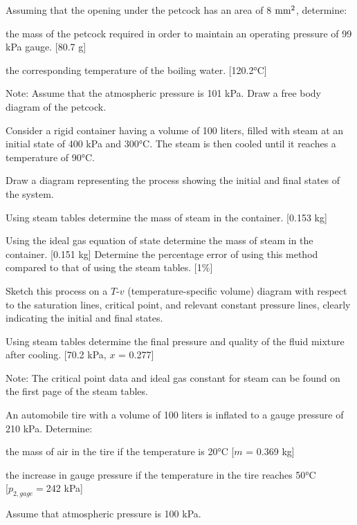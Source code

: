 \begin{homework}
Assuming that the opening under the petcock has an area of 8 $\rm mm^2$, determine:

\begin{questionparts}
\item the mass of the petcock required in order to maintain an operating pressure of 99 kPa gauge. {\color{red}[80.7 g]}

\item the corresponding temperature of the boiling water. {\color{red}[120.2°C]}
\end{questionparts}
Note: Assume that the atmospheric pressure is 101 kPa. Draw a free body diagram of the petcock.

\question Consider a rigid container having a volume of 100 liters, filled with steam at an initial state of 400 kPa and 300°C. The steam is then cooled until it reaches a temperature of 90°C.

\begin{questionparts}
\item Draw a diagram representing the process showing the initial and final states of the system.

\item Using steam tables determine the mass of steam in the container. {\color{red} [0.153 kg]}

\item Using the ideal gas equation of state determine the mass of steam in the container. {\color{red} [0.151 kg]}
Determine the percentage error of using this method compared to that of using the steam tables. {\color{red}[1\%]}

\item Sketch this process on a $T$-$v$ (temperature-specific volume) diagram with respect to the saturation lines, critical point, and relevant constant pressure lines, clearly indicating the initial and final states.

\item Using steam tables determine the final pressure and quality of the fluid mixture after cooling. {\color{red}[70.2 kPa, $x$ = 0.277]}
\end{questionparts}
Note: The critical point data and ideal gas constant for steam can be found on the first page of the steam tables.


\question An automobile tire with a volume of 100 liters is inflated to a gauge pressure of 210 kPa. Determine:
\begin{questionparts}
\item the mass of air in the tire if the temperature is 20°C {\color{red} [$m$ = 0.369 kg]}
\item the increase in gauge pressure if the temperature in the tire reaches 50°C \\{\color{red} [$p_{2,gage}=$242 kPa]}
\end{questionparts}
Assume that atmospheric pressure is 100 kPa.


\end{homework}
